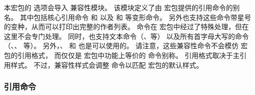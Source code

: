 
本宏包的  选项会导入  兼容性模块。
该模块定义了由  宏包提供的引用命令的别名。
其中包括核心引用命令  和  以及  和  等变形命令。
另外也支持这些命令带星号的变种，从而可以打印出完整的作者列表。
 命令在  宏包中经过了特殊处理，但在这里不会专门处理。
同时，也支持文本命令（、等）
以及所有首字母大写的命令（、、 等）。
另外，、 和  也是可以使用的。
请注意，这些兼容性命令不会模仿  宏包的引用格式，
而仅仅是  宏包中功能上等价的  命令别称。
引用格式取决于主引用样式。
不过，兼容性样式会调整  命令以匹配  宏包的默认样式。

\subsubsection[\sty{mcite} 引用命令]{ 引用命令}
\label{use:cit:mct}


